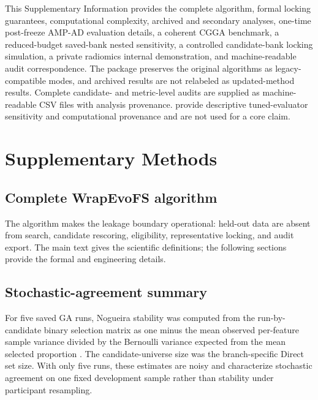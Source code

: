 \supplementarysetup
This Supplementary Information provides the complete algorithm, formal locking guarantees, computational complexity, archived and secondary analyses, one-time post-freeze AMP-AD evaluation details, a coherent CGGA benchmark, a reduced-budget saved-bank nested sensitivity, a controlled candidate-bank locking simulation, a private radiomics internal demonstration, and machine-readable audit correspondence. The package preserves the original algorithms as legacy-compatible modes, and archived results are not relabeled as updated-method results. Complete candidate- and metric-level audits are supplied as machine-readable CSV files with analysis provenance.  provide descriptive tuned-evaluator sensitivity and computational provenance and are not used for a core claim.


\section{Supplementary Methods}

\subsection{Complete WrapEvoFS algorithm}



The algorithm makes the leakage boundary operational: held-out data are absent from search, candidate rescoring, eligibility, representative locking, and audit export. The main text gives the scientific definitions; the following sections provide the formal and engineering details.

\subsection{Stochastic-agreement summary}

For five saved GA runs, Nogueira stability was computed from the run-by-candidate binary selection matrix as one minus the mean observed per-feature sample variance divided by the Bernoulli variance expected from the mean selected proportion \citep{ref36}. The candidate-universe size was the branch-specific Direct set size. With only five runs, these estimates are noisy and characterize stochastic agreement on one fixed development sample rather than stability under participant resampling.



